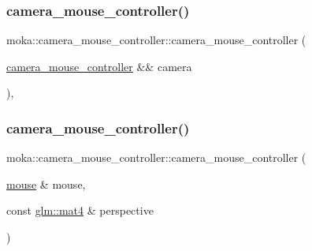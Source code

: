 \mbox{\label{classmoka_1_1camera__mouse__controller_ab07b5dda70f97878a888e406e3be3bb4}} 
\subsubsection{\texorpdfstring{camera\_mouse\_controller()}{camera\_mouse\_controller()}\hspace{0.1cm}{\footnotesize\ttfamily [2/3]}}
{\footnotesize\ttfamily moka\+::camera\+\_\+mouse\+\_\+controller\+::camera\+\_\+mouse\+\_\+controller (\begin{DoxyParamCaption}\item[{\mbox{\hyperlink{classmoka_1_1camera__mouse__controller}{camera\+\_\+mouse\+\_\+controller}} \&\&}]{camera }\end{DoxyParamCaption})\hspace{0.3cm}{\ttfamily [delete]}, {\ttfamily [noexcept]}}

\mbox{\label{classmoka_1_1camera__mouse__controller_a82038995539fcb2b51f88d2669bb6fcb}} 
\subsubsection{\texorpdfstring{camera\_mouse\_controller()}{camera\_mouse\_controller()}\hspace{0.1cm}{\footnotesize\ttfamily [3/3]}}
{\footnotesize\ttfamily moka\+::camera\+\_\+mouse\+\_\+controller\+::camera\+\_\+mouse\+\_\+controller (\begin{DoxyParamCaption}\item[{\mbox{\hyperlink{classmoka_1_1mouse}{mouse}} \&}]{mouse,  }\item[{const \mbox{\hyperlink{namespacemoka_aed2224bc0e5b79e57a8975ded94ee1aaabe14b41eb96410ea28b32bc138d885ae}{glm\+::mat4}} \&}]{perspective }\end{DoxyParamCaption})}



